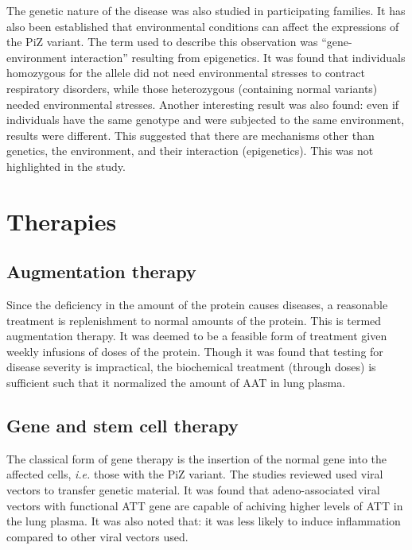 The genetic nature of the disease was also studied in participating families.
It has also been established that environmental conditions can affect the expressions of the PiZ variant.
The term used to describe this observation was ``gene-environment interaction'' resulting from epigenetics.
It was found that individuals homozygous for the allele did not need environmental stresses to contract respiratory disorders, while those heterozygous (containing normal variants) needed environmental stresses.
Another interesting result was also found: even if individuals have the same genotype and were subjected to the same environment, results were different.
This suggested that there are mechanisms other than genetics, the environment, and their interaction (epigenetics).
This was not highlighted in the study.

\section{Therapies}
\subsection{Augmentation therapy}
Since the deficiency in the amount of the protein causes diseases, a reasonable treatment is replenishment to normal amounts of the protein.
This is termed augmentation therapy.
It was deemed to be a feasible form of treatment given weekly infusions of doses of the protein.
Though it was found that testing for disease severity is impractical, the biochemical treatment (through doses) is sufficient such that it normalized the amount of AAT in lung plasma.

\subsection{Gene and stem cell therapy}
The classical form of gene therapy is the insertion of the normal gene into the affected cells, \textit{i.e.} those with the PiZ variant.
The studies reviewed used viral vectors to transfer genetic material.
It was found that adeno-associated viral vectors with functional ATT gene are capable of achiving higher levels of ATT in the lung plasma.
It was also noted that: it was less likely to induce inflammation compared to other viral vectors used.

